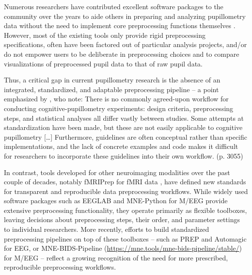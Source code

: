 Numerous researchers have contributed excellent software packages to the community over the years to aide others in preparing and analyzing pupillometry data without the need to implement core preprocessing functions themselves \parencite[e.g.,][]{forbes2020pupillometryr,geller2020gazer,hershman2019chap,kinley2021pupl,tsukahara2020pupillometry}. However, most of the existing tools only provide rigid preprocessing specifications, often have been factored out of particular analysis projects, and/or do not empower users to be deliberate in preprocessing choices and to compare visualizations of preprocessed pupil data to that of raw pupil data.

Thus, a critical gap in current pupillometry research is the absence of an integrated, standardized, and adaptable preprocessing pipeline – a point emphasized by \textcite{mathot2023methods}, who note:
There is no commonly agreed-upon workflow for conducting cognitive-pupillometry experiments: design criteria, preprocessing steps, and statistical analyses all differ vastly between studies. Some attempts at standardization have been made, but these are not easily applicable to cognitive pupillometry […] Furthermore, guidelines are often conceptual rather than specific implementations, and the lack of concrete examples and code makes it difficult for researchers to incorporate these guidelines into their own workflow. (p. 3055)

In contrast, tools developed for other neuroimaging modalities over the past couple of decades, notably fMRIPrep for fMRI data \parencite{esteban2020analysis,esteban2019fmriprep}, have defined new standards for transparent and reproducible data preprocessing workflows. While widely used software packages such as EEGLAB \parencite{delorme2004eeglab} and MNE-Python \parencite{gramfort2013meg} for M/EEG provide extensive preprocessing functionality, they operate primarily as flexible toolboxes, leaving decisions about preprocessing steps, their order, and parameter settings to individual researchers. More recently, efforts to build standardized preprocessing pipelines on top of these toolboxes – such as PREP \parencite{bigdelyshamlo2015prep} and Automagic \parencite{pedroni2019automagic} for EEG, or MNE-BIDS-Pipeline (\url{https://mne.tools/mne-bids-pipeline/stable/}) for M/EEG – reflect a growing recognition of the need for more prescribed, reproducible preprocessing workflows.

